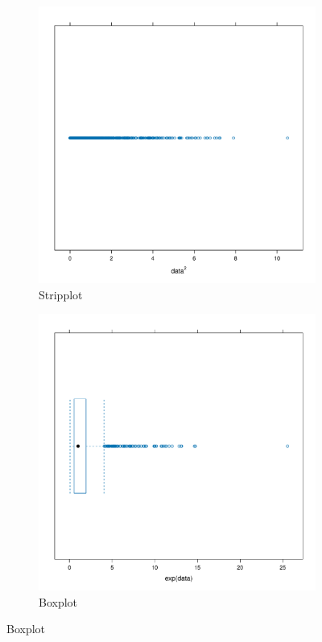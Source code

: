 \documentclass[a4paper,12pt]{article}
\begin{document}
\begin{figure}[htbp]
    \vspace{1em} %
    
    \begin{subfigure}[t]{0.45\textwidth}
        \centering
        \includegraphics[width=\textwidth]{stripplot.pdf} %
        \caption{Stripplot}
    \end{subfigure}
    \hfill
    \begin{subfigure}[t]{0.45\textwidth}
        \centering
        \includegraphics[width=\textwidth]{boxplot.pdf} %
        \caption{Boxplot}
    \end{subfigure}
    

\end{figure}
\end{document}
